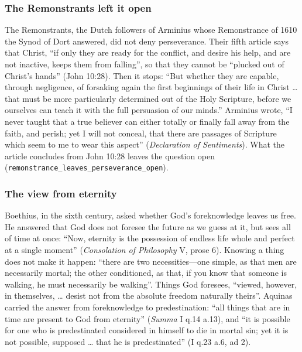 \documentclass[11pt]{article}
\begin{document}
\subsubsection*{The Remonstrants left it open}
The Remonstrants, the Dutch followers of Arminius whose Remonstrance of 1610 the Synod of Dort answered, did not deny perseverance. Their fifth article says that Christ, “if only they are ready for the conflict, and desire his help, and are not inactive, keeps them from falling”, so that they cannot be “plucked out of Christ’s hands” (John 10:28). Then it stops: “But whether they are capable, through negligence, of forsaking again the first beginnings of their life in Christ … that must be more particularly determined out of the Holy Scripture, before we ourselves can teach it with the full persuasion of our minds.” Arminius wrote, “I never taught that a true believer can either totally or finally fall away from the faith, and perish; yet I will not conceal, that there are passages of Scripture which seem to me to wear this aspect” (\emph{Declaration of Sentiments}). What the article concludes from John 10:28 leaves the question open (\texttt{remonstrance\_\allowbreak{}leaves\_\allowbreak{}perseverance\_\allowbreak{}open}).

\subsubsection*{The view from eternity}
Boethius, in the sixth century, asked whether God’s foreknowledge leaves us free. He answered that God does not foresee the future as we guess at it, but sees all of time at once: “Now, eternity is the possession of endless life whole and perfect at a single moment” (\emph{Consolation of Philosophy} V, prose 6). Knowing a thing does not make it happen: “there are two necessities—one simple, as that men are necessarily mortal; the other conditioned, as that, if you know that someone is walking, he must necessarily be walking”. Things God foresees, “viewed, however, in themselves, … desist not from the absolute freedom naturally theirs”. Aquinas carried the answer from foreknowledge to predestination: “all things that are in time are present to God from eternity” (\emph{Summa} I q.14 a.13), and “it is possible for one who is predestinated considered in himself to die in mortal sin; yet it is not possible, supposed … that he is predestinated” (I q.23 a.6, ad 2).
\end{document}
